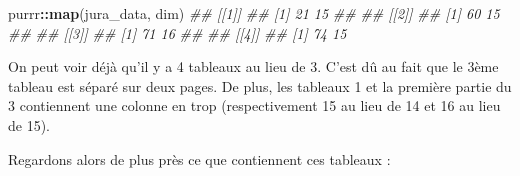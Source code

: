 \documentclass[
  french,
]{book}
\newenvironment{Shaded}{\begin{snugshade}}{\end{snugshade}}
\newcommand{\CommentTok}[1]{\textcolor[rgb]{0.56,0.35,0.01}{\textit{#1}}}
\newcommand{\KeywordTok}[1]{\textcolor[rgb]{0.13,0.29,0.53}{\textbf{#1}}}
\newcommand{\NormalTok}[1]{#1}
\newcommand{\OperatorTok}[1]{\textcolor[rgb]{0.81,0.36,0.00}{\textbf{#1}}}
\begin{document}
\begin{Shaded}
\begin{Highlighting}[]
\NormalTok{purrr}\OperatorTok{::}\KeywordTok{map}\NormalTok{(jura\_data, dim)}
\CommentTok{\#\# [[1]]}
\CommentTok{\#\# [1] 21 15}
\CommentTok{\#\# }
\CommentTok{\#\# [[2]]}
\CommentTok{\#\# [1] 60 15}
\CommentTok{\#\# }
\CommentTok{\#\# [[3]]}
\CommentTok{\#\# [1] 71 16}
\CommentTok{\#\# }
\CommentTok{\#\# [[4]]}
\CommentTok{\#\# [1] 74 15}
\end{Highlighting}
\end{Shaded}

On peut voir déjà qu'il y a 4 tableaux au lieu de 3. C'est dû au fait que le
3ème tableau est séparé sur deux pages. De plus, les tableaux 1 et la première
partie du 3 contiennent une colonne en trop (respectivement 15 au lieu de 14 et
16 au lieu de 15).

Regardons alors de plus près ce que contiennent ces tableaux :
\end{document}
